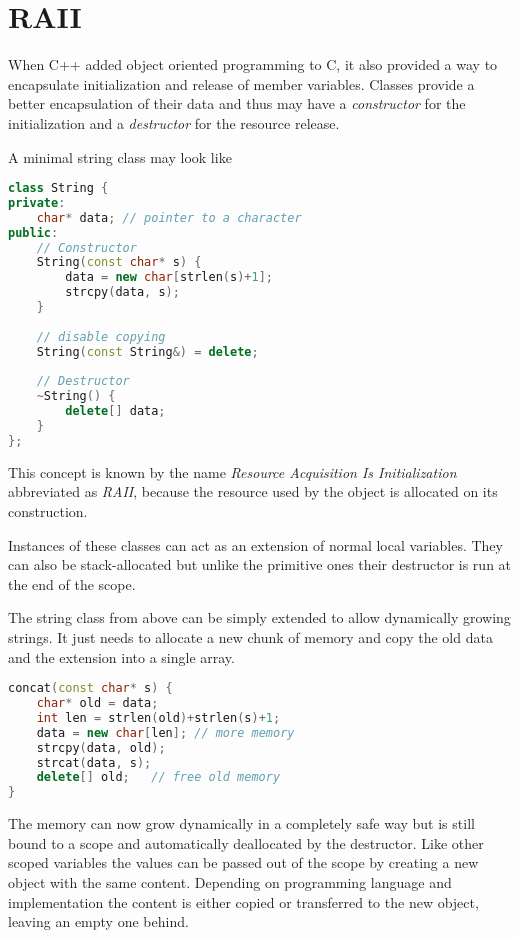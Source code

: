 \documentclass[conference,twocolumn]{IEEEtran}
\begin{document}
\section{RAII}
When C++ added object oriented programming to C, it also provided a way to encapsulate initialization and release of member variables. Classes provide a better encapsulation of their data and thus may have a \emph{constructor} for the initialization and a \emph{destructor} for the resource release. \cite{stroustrupFoundationsCpp}

\pagebreak

A minimal string class may look like
\begin{lstlisting}[language=c++,frame=single]
class String {
private:
    char* data; // pointer to a character
public:
    // Constructor
    String(const char* s) {
        data = new char[strlen(s)+1];
        strcpy(data, s);
    }
    
    // disable copying
    String(const String&) = delete;
    
    // Destructor
    ~String() {
        delete[] data;
    }
};
\end{lstlisting}

This concept is known by the name \emph{Resource Acquisition Is Initialization} abbreviated as \emph{RAII}, because the resource used by the object is allocated on its construction.

Instances of these classes can act as an extension of normal local variables. They can also be stack-allocated but unlike the primitive ones their destructor is run at the end of the scope.

The string class from above can be simply extended to allow dynamically growing strings. It just needs to allocate a new chunk of memory and copy the old data and the extension into a single array.

\begin{lstlisting}[language=c++, frame=single]
concat(const char* s) {
    char* old = data;
    int len = strlen(old)+strlen(s)+1;
    data = new char[len]; // more memory
    strcpy(data, old);
    strcat(data, s);
    delete[] old;	// free old memory
}
\end{lstlisting}


The memory can now grow dynamically in a completely safe way but is still bound to a scope and automatically deallocated by the destructor. Like other scoped variables the values can be passed out of the scope by creating a new object with the same content. Depending on programming language and implementation the content is either copied or transferred to the new object, leaving an empty one behind.
\end{document}
